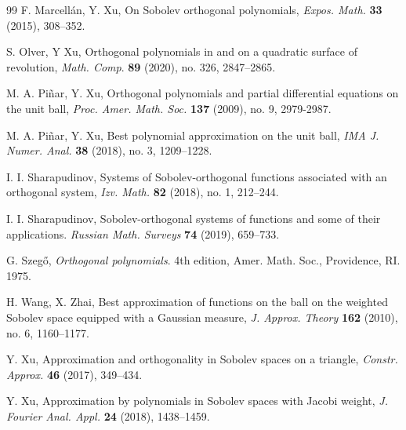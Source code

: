 \documentclass{amsart}
\theoremstyle{remark}
\begin{document}
\begin{thebibliography}{99}
        F. Marcell\'an, Y. Xu,
        On Sobolev orthogonal polynomials,
        \textit{Expos. Math.} \textbf{33} (2015), 308--352.

        S. Olver, Y Xu,
        Orthogonal polynomials in and on a quadratic surface of revolution,
        \textit{Math. Comp}. \textbf{89} (2020), no. 326, 2847--2865.

        M. A. Pi\~nar, Y. Xu,
        Orthogonal polynomials and partial differential equations on the unit ball,
        \textit{Proc. Amer. Math. Soc.} \textbf{137} (2009), no. 9, 2979-2987.

        M. A. Pi\~nar, Y. Xu,
        Best polynomial approximation on the unit ball,
        \textit{IMA J. Numer. Anal.} \textbf{38} (2018), no. 3, 1209--1228.

        I. I. Sharapudinov,
        Systems of Sobolev-orthogonal functions associated with an orthogonal system,
        \textit{Izv. Math. } \textbf{82} (2018), no. 1, 212--244.

        I. I. Sharapudinov,
        Sobolev-orthogonal systems of functions and some of their applications.
        \textit{Russian Math. Surveys} \textbf{74} (2019), 659--733.

       G. Szeg\H{o},
       \textit{Orthogonal polynomials}.
       4th edition, Amer. Math. Soc., Providence, RI. 1975.

        H. Wang, X. Zhai,
        Best approximation of functions on the ball on the weighted Sobolev space equipped with a Gaussian measure,
        \textit{J. Approx. Theory} \textbf{162} (2010), no. 6, 1160--1177.

       Y. Xu,
       Approximation and orthogonality in Sobolev spaces on a triangle,
       \textit{Constr. Approx.} \textbf{46} (2017), 349--434.

       Y. Xu,
       Approximation by polynomials in Sobolev spaces with Jacobi weight,
       \textit{J. Fourier Anal. Appl.} \textbf{24} (2018), 1438--1459.


\end{thebibliography}
\end{document}
